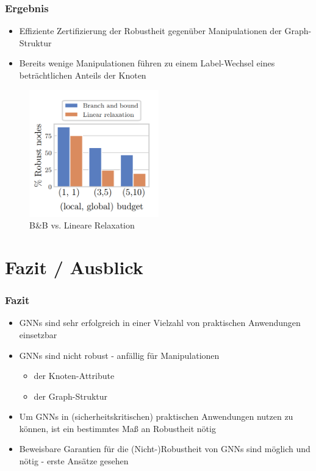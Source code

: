 \documentclass{beamer}
\begin{document}
\begin{frame}
  \frametitle{Ergebnis}
  \begin{itemize}
    \item Effiziente Zertifizierung der Robustheit gegenüber Manipulationen der Graph-Struktur
    \item Bereits wenige Manipulationen führen zu einem Label-Wechsel eines beträchtlichen Anteils der Knoten
  \end{itemize}
  \begin{figure}
    \centering
    \includegraphics[width=0.5\textwidth]{img/graph_struct_pert_res.png}
    \caption*{B\&B vs. Lineare Relaxation \cite{10.1145/3394486.3403217}}
  \end{figure}
\end{frame}

\section{Fazit / Ausblick}

\begin{frame}
  \frametitle{Fazit}

  \begin{itemize}
    \item GNNs sind sehr erfolgreich in einer Vielzahl von praktischen Anwendungen einsetzbar
    \item GNNs sind nicht robust - anfällig für Manipulationen
    \begin{itemize}
      \item der Knoten-Attribute
      \item der Graph-Struktur
    \end{itemize}
    \item Um GNNs in (sicherheitskritischen) praktischen Anwendungen nutzen zu können, ist ein bestimmtes Maß an Robustheit nötig
    \item Beweisbare Garantien für die (Nicht-)Robustheit von GNNs sind möglich und nötig - erste Ansätze gesehen
  \end{itemize}
\end{frame}
\end{document}

